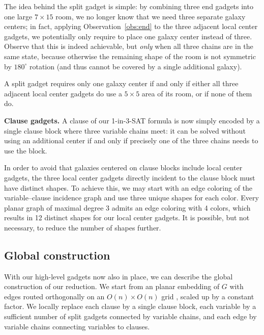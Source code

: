 The idea behind the split gadget is simple:
by combining three end gadgets into one large $7\times15$ room, we no longer know that we need three separate galaxy centers; in fact, applying Observation~\ref {obs:end} to the three adjacent local center gadgets, we potentially only require to place one galaxy center instead of three.
Observe that this is indeed achievable, but \emph{only} when all three chains are in the same state, because otherwise the remaining shape of the room is not symmetric by $180^\circ$ rotation (and thus cannot be covered by a single additional galaxy).

\begin{observation}
  A split gadget requires only one galaxy center if and only if either all three adjacent local center gadgets do use a $5\times5$ area of its room, or if none of them do.
\end{observation}

\textbf{Clause gadgets.}
A clause of our 1-in-3-SAT formula is now simply encoded by a single clause block where three variable chains meet: it can be solved without using an additional center if and only if precisely one of the three chains needs to use the block.

In order to avoid that galaxies centered on clause blocks include local center gadgets, the three local center gadgets directly incident to the clause block must have distinct shapes.
To achieve this, we may start with an edge coloring of the variable--clause incidence graph and use three unique shapes for each color. Every planar graph of maximal degree $3$ admits an edge coloring with 4 colors, which results in 12 distinct shapes for our local center gadgets.
It is possible, but not necessary, to reduce the number of shapes further.

\subsection{Global construction}

With our high-level gadgets now also in place, we can describe the global construction of our reduction.
%
We start from an planar embedding of $G$
with edges routed orthogonally on an $O(n) \times O(n)$ grid
\cite{biedl98}, scaled up by a constant factor.
We locally replace each clause by a single clause block, each variable by a sufficient number of split gadgets connected by variable chains, and each edge by variable chains connecting variables to clauses.


